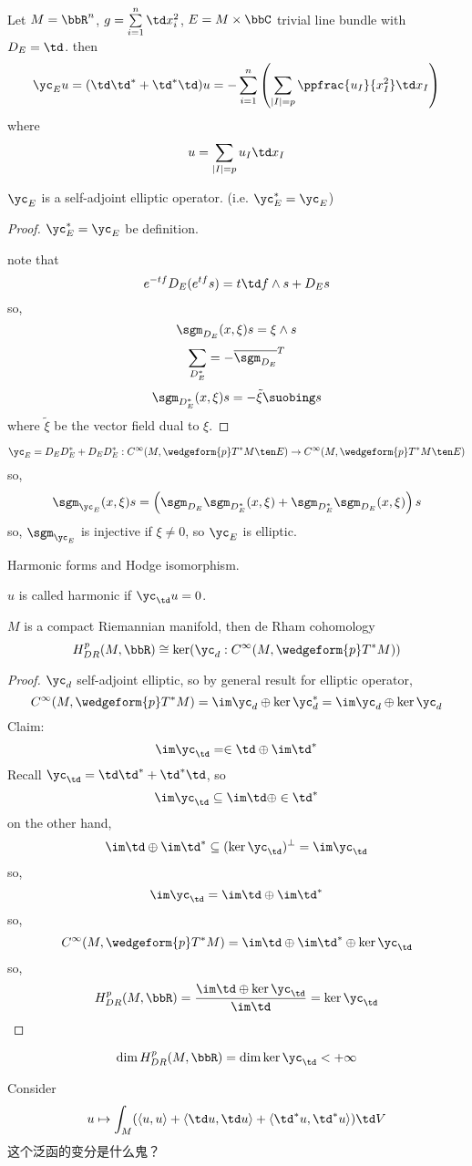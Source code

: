 \begin{example}
Let $M=\bbR^n$, $g=\sum\limits_{i=1}^n\td x_i^2$,
$E=M\times \bbC$ trivial line bundle with $D_E=\td$.
then
$$\yc_Eu=(\td\td^*+\td^*\td)u=
-\sum_{i=1}^n
  \left(
    \sum_{|I|=p}
    \ppfrac{u_I}{x_I^2}
    \td x_I
  \right)
$$
where
$$u=\sum_{|I|=p}u_I\td x_I$$
\end{example}

\begin{prop}
$\yc_E$ is a self-adjoint elliptic operator.
(i.e. $\yc_E^*=\yc_E$)
\end{prop}
\begin{proof}
$\yc_E^*=\yc_E$ be definition.

note that
$$e^{-tf}D_E(e^{tf}s)=t\td f\wedge s+D_Es$$
so,
$$\sgm_{D_E}(x,\xi)s=\xi\wedge s$$
$$\sum_{D^*_E}=-\overline{\sgm_{D_E}}^T$$
$$\sgm_{D^*_E}(x,\xi)s=-\tilde{\xi}\suobing s$$
where $\tilde{\xi}$ be the vector field dual to $\xi$.
\end{proof}

\begin{definition}
$$\yc_E=D_ED_E^*+D_ED_E^*:
C^\infty(M,\wedgeform{p}T^*M\ten E)\to
C^\infty(M,\wedgeform{p}T^*M\ten E)$$
so,
$$\sgm_{\yc_E}(x,\xi)s=
 \left(
   \sgm_{D_E}\sgm_{D_E^*}(x,\xi)
   +\sgm_{D_E^*}\sgm_{D_E}(x,\xi)
 \right)s
$$
so,
$\sgm_{\yc_E}$ is injective if $\xi\neq 0$, so $\yc_E$ is elliptic.
\end{definition}

Harmonic forms and Hodge isomorphism.
\begin{definition}
$u$ is called harmonic if $\yc_{\td}u=0$.
\end{definition}

\begin{thm}
$M$ is a compact Riemannian manifold,
then de Rham cohomology
$$H^p_{DR}(M,\bbR)\cong
\ker(\yc_d:C^\infty(M,\wedgeform{p}T^*M))
$$
\end{thm}
\begin{proof}
$\yc_d$ self-adjoint elliptic, so by general result for elliptic operator,
$$C^\infty(M,\wedgeform{p}T^*M)=\im\yc_d\oplus\ker\yc_d^*
=\im\yc_d\oplus\ker\yc_d$$
Claim:
$$\im\yc_{\td}=\in \td\oplus\im\td^*$$
Recall $\yc_{\td}=\td\td^*+\td^*\td$, so
$$\im\yc_\td\subseteq\im\td\oplus\in\td^*$$
on the other hand,
$$\im\td\oplus\im\td^*\subseteq(\ker\yc_\td)^\bot=\im\yc_\td$$
so,
$$\im\yc_\td=\im\td\oplus\im\td^*$$
so,
$$C^\infty(M,\wedgeform{p}T^*M)=
\im\td\oplus\im\td^*\oplus\ker\yc_\td
$$
so,
$$
  H^p_{DR}(M,\bbR)
=\frac{\im\td\oplus\ker\yc_\td}{\im\td}=\ker\yc_\td
$$
\end{proof}

\begin{cor}
$$\dim H^{p}_{DR}(M,\bbR)=\dim\ker\yc_\td<+\infty$$
\end{cor}

\begin{rem}Consider
$$u\mapsto \int_M(
  \langle u,u \rangle+
  \langle \td u,\td u \rangle+
  \langle \td^*u,\td^*u \rangle
)\td V$$
这个泛函的变分是什么鬼？
\end{rem}












